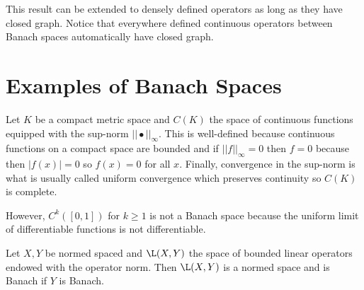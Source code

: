 \documentclass[12pt]{article}
\begin{document}
\begin{rmk}
This result can be extended to densely defined operators as long as they have closed graph. Notice that everywhere defined continuous operators between Banach spaces automatically have closed graph.
\end{rmk}

\section{Examples of Banach Spaces}

\begin{ex}
Let $K$ be a compact metric space and $C(K)$ the space of continuous functions equipped with the sup-norm $|| \bullet ||_\infty$. This is well-defined because continuous functions on a compact space are bounded and if $|| f ||_{\infty} = 0$ then $f = 0$ because then $|f(x)| = 0$ so $f(x) = 0$ for all $x$. Finally, convergence in the sup-norm is what is usually called uniform convergence which preserves continuity so $C(K)$ is complete.
\end{ex}

\begin{ex}
However, $C^k([0,1])$ for $k \ge 1$ is not a Banach space because the uniform limit of differentiable functions is not differentiable.
\end{ex}

\begin{prop}
Let $X, Y$ be normed spaced and $\L(X, Y)$ the space of bounded linear operators endowed with the operator norm. Then $\L(X, Y)$ is a normed space and is Banach if $Y$ is Banach.
\end{prop}
\end{document}
